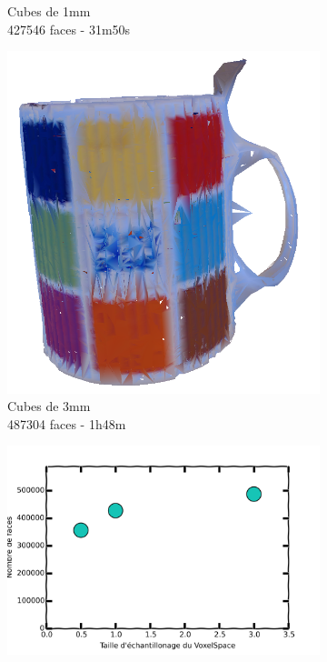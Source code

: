 \documentclass[a4paper,10pt]{report}
\begin{document}
\begin{figure}[h!]
\begin{subfigure}[b]{0.3\textwidth}
        \caption{Cubes de 1mm\\427546 faces - 31m50s}
    \end{subfigure}
    \begin{subfigure}[b]{0.3\textwidth}
	    \includegraphics[width=\textwidth]{results/nodp-ipd.png}
        \caption{Cubes de 3mm\\487304 faces - 1h48m}
    \end{subfigure}
    \begin{subfigure}[b]{0.3\textwidth}
	    \includegraphics[width=\textwidth]{results/vs-triangles-cmp.png}

\end{subfigure}
\end{figure}
\end{document}
